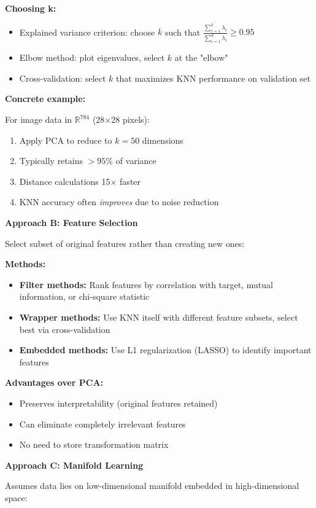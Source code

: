 \documentclass[12pt]{article}
\begin{document}
\begin{solution}
\textbf{Choosing k:}
\begin{itemize}
    \item Explained variance criterion: choose \(k\) such that \(\frac{\sum_{i=1}^k \lambda_i}{\sum_{i=1}^d \lambda_i} \geq 0.95\)
    \item Elbow method: plot eigenvalues, select \(k\) at the "elbow"
    \item Cross-validation: select \(k\) that maximizes KNN performance on validation set
\end{itemize}

\textbf{Concrete example:}

For image data in \(\mathbb{R}^{784}\) (28×28 pixels):
\begin{enumerate}
    \item Apply PCA to reduce to \(k=50\) dimensions
    \item Typically retains \(>95\%\) of variance
    \item Distance calculations 15× faster
    \item KNN accuracy often \textit{improves} due to noise reduction
\end{enumerate}

\textbf{Approach B: Feature Selection}

Select subset of original features rather than creating new ones:

\textbf{Methods:}
\begin{itemize}
    \item \textbf{Filter methods:} Rank features by correlation with target, mutual information, or chi-square statistic
    \item \textbf{Wrapper methods:} Use KNN itself with different feature subsets, select best via cross-validation
    \item \textbf{Embedded methods:} Use L1 regularization (LASSO) to identify important features
\end{itemize}

\textbf{Advantages over PCA:}
\begin{itemize}
    \item Preserves interpretability (original features retained)
    \item Can eliminate completely irrelevant features
    \item No need to store transformation matrix
\end{itemize}

\textbf{Approach C: Manifold Learning}

Assumes data lies on low-dimensional manifold embedded in high-dimensional space:


\end{solution}
\end{document}
